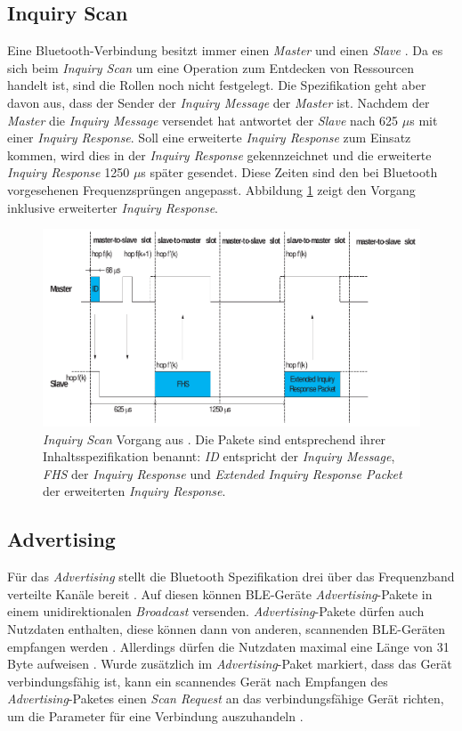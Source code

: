 \subsection{Inquiry Scan}
Eine Bluetooth-Verbindung besitzt immer einen \emph{Master} und einen \emph{Slave} \cite{blue2010inquiry}.
Da es sich beim \emph{Inquiry Scan} um eine Operation zum Entdecken von Ressourcen handelt ist, sind die Rollen noch nicht festgelegt.
Die Spezifikation geht aber davon aus, dass der Sender der \emph{Inquiry Message} der \emph{Master} ist.
Nachdem der \emph{Master} die \emph{Inquiry Message} versendet hat antwortet der \emph{Slave} nach 625 $\mu$s mit einer \emph{Inquiry Response}.
Soll eine erweiterte \emph{Inquiry Response} zum Einsatz kommen, wird dies in der \emph{Inquiry Response} gekennzeichnet und die erweiterte \emph{Inquiry Response} 1250 $\mu$s später gesendet.
Diese Zeiten sind den bei Bluetooth vorgesehenen Frequenzsprüngen angepasst.
Abbildung \ref{fig:inqscan} zeigt den Vorgang inklusive erweiterter \emph{Inquiry Response}.


\begin{figure}[h]
  \centering
	\includegraphics[width=\textwidth]{images/inqscan.png}
  \caption{\emph{Inquiry Scan} Vorgang aus \cite{blue2010inquiry}. Die Pakete sind entsprechend ihrer Inhaltsspezifikation benannt: \emph{ID} entspricht der \emph{Inquiry Message}, \emph{FHS} der \emph{Inquiry Response} und \emph{Extended Inquiry Response Packet} der erweiterten \emph{Inquiry Response}.}
  \label{fig:inqscan}
\end{figure}

\subsection{Advertising}
Für das \emph{Advertising} stellt die Bluetooth Spezifikation drei über das Frequenzband verteilte Kanäle bereit \cite{blue2010channel}.
Auf diesen können BLE-Geräte \emph{Advertising}-Pakete in einem unidirektionalen \emph{Broadcast} versenden.
\emph{Advertising}-Pakete dürfen auch Nutzdaten enthalten, diese können dann von anderen, scannenden BLE-Geräten empfangen werden \cite{blue2010advertising}.
Allerdings dürfen die Nutzdaten maximal eine Länge von 31 Byte aufweisen \cite{blue2010pdu}.
Wurde zusätzlich im \emph{Advertising}-Paket markiert, dass das Gerät verbindungsfähig ist, kann ein scannendes Gerät nach Empfangen des \emph{Advertising}-Paketes einen \emph{Scan Request} an das verbindungsfähige Gerät richten, um die Parameter für eine Verbindung auszuhandeln \cite{blue2010scanning}.


